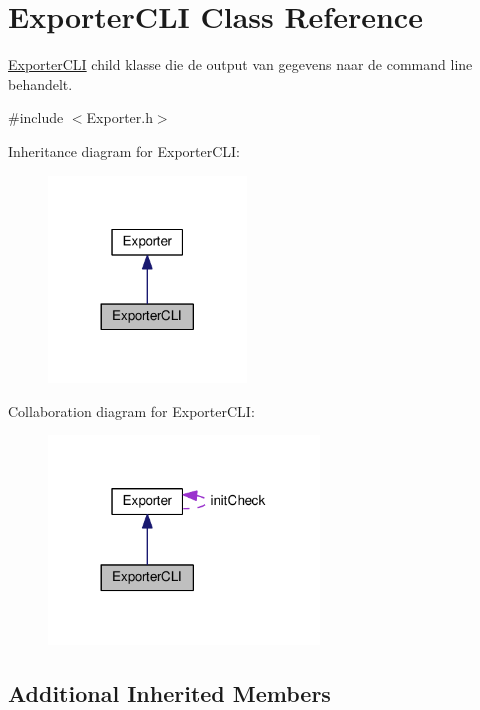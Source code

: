 \hypertarget{class_exporter_c_l_i}{}\section{Exporter\+C\+LI Class Reference}
\label{class_exporter_c_l_i}


\hyperlink{class_exporter_c_l_i}{Exporter\+C\+LI} child klasse die de output van gegevens naar de command line behandelt.  




{\ttfamily \#include $<$Exporter.\+h$>$}



Inheritance diagram for Exporter\+C\+LI\+:
\nopagebreak
\begin{figure}[H]
\begin{center}
\leavevmode
\includegraphics[width=149pt]{class_exporter_c_l_i__inherit__graph}
\end{center}
\end{figure}


Collaboration diagram for Exporter\+C\+LI\+:
\nopagebreak
\begin{figure}[H]
\begin{center}
\leavevmode
\includegraphics[width=204pt]{class_exporter_c_l_i__coll__graph}
\end{center}
\end{figure}
\subsection*{Additional Inherited Members}


